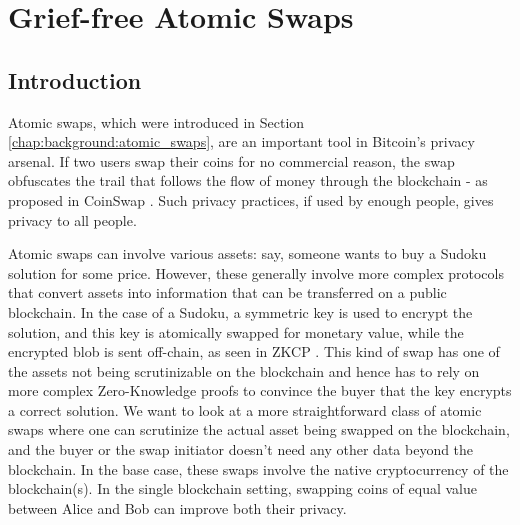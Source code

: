 \chapter{Grief-free Atomic Swaps}  %
\label{chapter:swaps}

\section{Introduction}
Atomic swaps, which were introduced in Section \ref{chap:background:atomic_swaps}, are an important tool in Bitcoin's privacy arsenal. If two users swap their coins for no commercial reason, the swap obfuscates the trail that follows the flow of money through the blockchain - as proposed in CoinSwap \cite{coinswap}. Such privacy practices, if used by enough people, gives privacy to all people. 

Atomic swaps can involve various assets: say, someone wants to buy a Sudoku solution for some price. However, these generally involve more complex protocols that convert assets into information that can be transferred on a public blockchain. In the case of a Sudoku, a symmetric key is used to encrypt the solution, and this key is atomically swapped for monetary value, while the encrypted blob is sent off-chain, as seen in ZKCP \cite{maxwell2016zero}. This kind of swap has one of the assets not being scrutinizable on the blockchain and hence has to rely on more complex Zero-Knowledge proofs to convince the buyer that the key encrypts a correct solution. We want to look at a more straightforward class of atomic swaps where one can scrutinize the actual asset being swapped on the blockchain, and the buyer or the swap initiator doesn't need any other data beyond the blockchain. In the base case, these swaps involve the native cryptocurrency of the blockchain(s). In the single blockchain setting, swapping coins of equal value between Alice and Bob can improve both their privacy.

